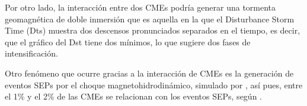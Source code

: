 Por otro lado, la interacción entre dos \acp{CME} podría generar una tormenta geomagnética de doble inmersión que es aquella en la que el Disturbance Storm Time (Dts) muestra dos descensos pronunciados separados en el tiempo, es decir, que el gráfico del Dst tiene dos mínimos, lo que sugiere dos fases de intensificación.

Otro fenómeno que ocurre gracias a la interacción de \acp{CME} es la generación de eventos SEPs por el choque magnetohidrodinámico, simulado por \cite{2004ApJ...616L.171S}, así pues, entre el 1$\%$ y el 2$\%$ de las \acp{CME} se relacionan con los eventos SEPs, según \cite{lugaz-2005}.




